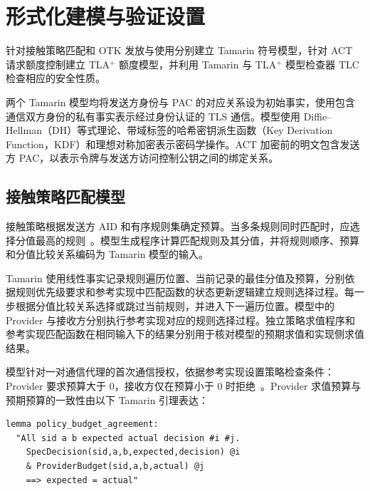 
\section{形式化建模与验证设置}
\label{sec:formal-modeling-analysis-setup}

针对接触策略匹配和 OTK 发放与使用分别建立 Tamarin 符号模型，针对 ACT 请求额度控制建立 TLA$^{+}$ 额度模型，并利用 Tamarin 与 TLA$^{+}$ 模型检查器 TLC 检查相应的安全性质。

两个 Tamarin 模型均将发送方身份与 PAC 的对应关系设为初始事实，使用包含通信双方身份的私有事实表示经过身份认证的 TLS 通信。模型使用 Diffie--Hellman（DH）等式理论、带域标签的哈希密钥派生函数（Key Derivation Function，KDF）和理想对称加密表示密码学操作。ACT 加密前的明文包含发送方 PAC，以表示令牌与发送方访问控制公钥之间的绑定关系。

\subsection{接触策略匹配模型}
\label{subsec:policy-evaluation-model}

接触策略根据发送方 AID 和有序规则集确定预算。当多条规则同时匹配时，应选择分值最高的规则~\cite{syros2025sagaV2,sagaReferenceImpl2026}。模型生成程序计算匹配规则及其分值，并将规则顺序、预算和分值比较关系编码为 Tamarin 模型的输入。

Tamarin 使用线性事实记录规则遍历位置、当前记录的最佳分值及预算，分别依据规则优先级要求和参考实现中匹配函数的状态更新逻辑建立规则选择过程。每一步根据分值比较关系选择或跳过当前规则，并进入下一遍历位置。模型中的 Provider 与接收方分别执行参考实现对应的规则选择过程。独立策略求值程序和参考实现匹配函数在相同输入下的结果分别用于核对模型的预期求值和实现侧求值结果。

模型针对一对通信代理的首次通信授权，依据参考实现设置策略检查条件：Provider 要求预算大于 $0$，接收方仅在预算小于 $0$ 时拒绝~\cite{sagaReferenceImpl2026}。Provider 求值预算与预期预算的一致性由以下 Tamarin 引理表达：

\begingroup
\renewcommand{\verbatimsize}{\footnotesize}
\setlength{\verbatimbaselineskip}{10pt}
\noindent\begin{minipage}{\linewidth}
\begin{verbatim}
lemma policy_budget_agreement:
  "All sid a b expected actual decision #i #j.
    SpecDecision(sid,a,b,expected,decision) @i
    & ProviderBudget(sid,a,b,actual) @j
    ==> expected = actual"
\end{verbatim}
\end{minipage}
\endgroup

